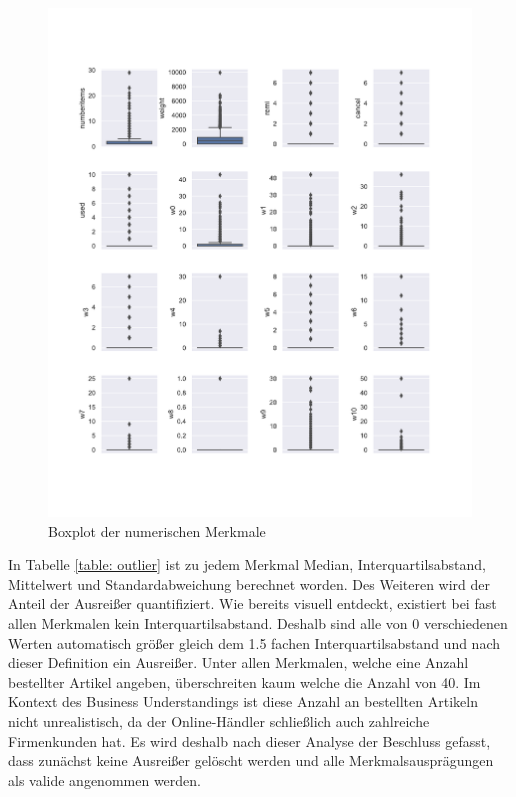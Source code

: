 \FloatBarrier
\begin{figure}[!htbp]
\begin{center}
\includegraphics[scale=0.6]{pdf/boxplot.pdf}
\end{center}
\caption{Boxplot der numerischen Merkmale}
\label{fig:boxplot}
\end{figure}
\FloatBarrier

In Tabelle \ref{table: outlier} ist zu jedem Merkmal Median, Interquartilsabstand, Mittelwert und Standardabweichung berechnet worden. Des Weiteren wird der Anteil der Ausreißer quantifiziert. Wie bereits visuell entdeckt, existiert bei fast allen Merkmalen kein Interquartilsabstand. Deshalb sind alle von 0 verschiedenen Werten automatisch größer gleich dem 1.5 fachen Interquartilsabstand und nach dieser Definition ein Ausreißer. Unter allen Merkmalen, welche eine Anzahl bestellter Artikel angeben, überschreiten kaum welche die Anzahl von 40. Im Kontext des Business Understandings ist diese Anzahl an bestellten Artikeln nicht unrealistisch, da der Online-Händler schließlich auch zahlreiche Firmenkunden hat. Es wird deshalb nach dieser Analyse der Beschluss gefasst, dass zunächst keine Ausreißer gelöscht werden und alle Merkmalsausprägungen als valide angenommen werden.\\

